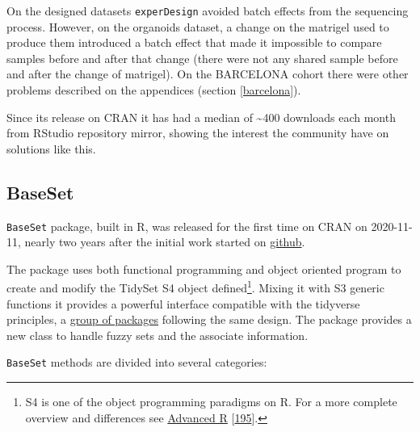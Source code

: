 \documentclass[
  12pt,
  a4paper,
  twoside,
  openright]{book}
\begin{document}
On the designed datasets \texttt{experDesign} avoided batch effects from the sequencing process.
However, on the organoids dataset, a change on the matrigel used to produce them introduced a batch effect that made it impossible to compare samples before and after that change (there were not any shared sample before and after the change of matrigel).
On the BARCELONA cohort there were other problems described on the appendices (section \ref{barcelona}).

Since its release on CRAN it has had a median of \textasciitilde400 downloads each month from RStudio repository mirror, showing the interest the community have on solutions like this.

\hypertarget{baseset-1}{%
\subsection{BaseSet}\label{baseset-1}}

\texttt{BaseSet} package, built in R, was released for the first time on CRAN on 2020-11-11, nearly two years after the initial work started on \href{https://github.com/llrs/BaseSet}{github}.

The package uses both functional programming and object oriented program to create and modify the TidySet S4 object defined\footnote{S4 is one of the object programming paradigms on R.
  For a more complete overview and differences see \href{https://adv-r.hadley.nz/oo.html}{Advanced R} {[}\protect\hyperlink{ref-wickham2019}{195}{]}.}.
Mixing it with S3 generic functions it provides a powerful interface compatible with the tidyverse principles, a \href{https://www.tidyverse.org/}{group of packages} following the same design.
The package provides a new class to handle fuzzy sets and the associate information.

\texttt{BaseSet} methods are divided into several categories:
\end{document}
